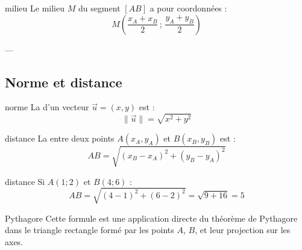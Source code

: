 \begin{proposition}{}{milieu}
Le milieu $M$ du segment $[AB]$ a pour coordonnées :
\[
M\left( \frac{x_A + x_B}{2} \, ; \, \frac{y_A + y_B}{2} \right)
\]
\end{proposition}

---

\subsection{Norme et distance}

\begin{definition}{}{norme}
La  d’un vecteur $\overrightarrow{u} = (x, y)$ est :
\[
\|\overrightarrow{u}\| = \sqrt{x^2 + y^2}
\]
\end{definition}

\begin{proposition}{}{distance}
La  entre deux points $A(x_A, y_A)$ et $B(x_B, y_B)$ est :
\[
AB = \sqrt{(x_B - x_A)^2 + (y_B - y_A)^2}
\]
\end{proposition}

\begin{exemple}{}{distance}
Si $A(1;2)$ et $B(4;6)$ :
\[
AB = \sqrt{(4 - 1)^2 + (6 - 2)^2} = \sqrt{9 + 16} = 5
\]
\end{exemple}

\begin{remarque}{}{Pythagore}
Cette formule est une application directe du théorème de Pythagore dans le triangle rectangle formé par les points $A$, $B$, et leur projection sur les axes.
\end{remarque}



